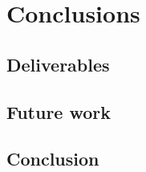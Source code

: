 \chapter{Conclusions}
\label{conclusion}


\section{Deliverables}



\section{Future work}

\section*{Conclusion}
